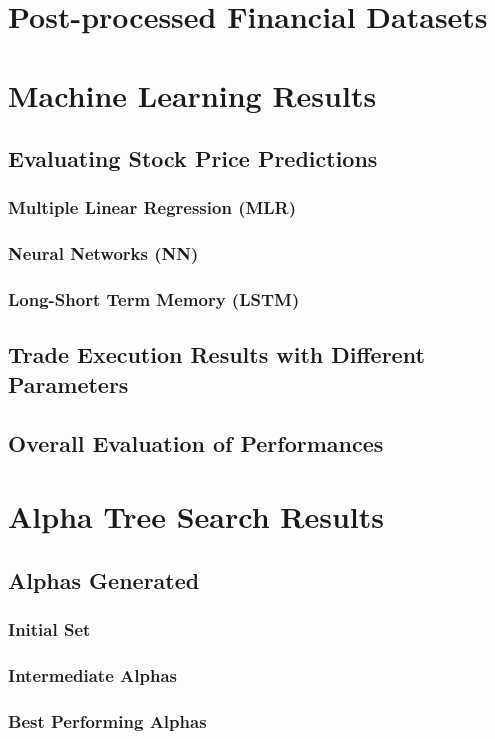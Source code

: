 \documentclass[a4paper,12pt]{report}
\numberwithin{equation}{section}
\theoremstyle{definition}
\begin{document}
\chapter{Post-processed Financial Datasets}

\chapter{Machine Learning Results}
\section{Evaluating Stock Price Predictions}
\subsection{Multiple Linear Regression (MLR)}
\subsection{Neural Networks (NN)}
\subsection{Long-Short Term Memory (LSTM)}
\section{Trade Execution Results with Different Parameters}
\section{Overall Evaluation of Performances}

\chapter{Alpha Tree Search Results}
\section{Alphas Generated}
\subsection{Initial Set}
\subsection{Intermediate Alphas}
\subsection{Best Performing Alphas}
\end{document}
